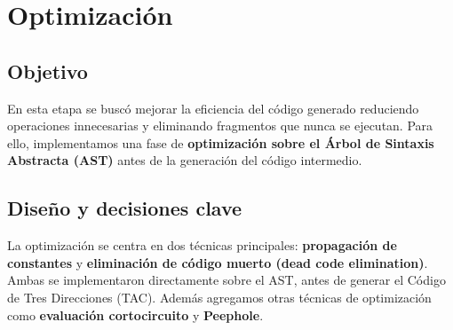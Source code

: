 \documentclass[12pt,a4paper]{article}
\begin{document}
\section{Optimización}

\subsection{Objetivo}
En esta etapa se buscó mejorar la eficiencia del código generado reduciendo operaciones innecesarias y eliminando fragmentos que nunca se ejecutan. Para ello, implementamos una fase de \textbf{optimización sobre el Árbol de Sintaxis Abstracta (AST)} antes de la generación del código intermedio.

\subsection{Diseño y decisiones clave}
La optimización se centra en dos técnicas principales: \textbf{propagación de constantes} y \textbf{eliminación de código muerto (dead code elimination)}. Ambas se implementaron directamente sobre el AST, antes de generar el Código de Tres Direcciones (TAC). Además agregamos otras técnicas de optimización como \textbf{evaluación cortocircuito} y \textbf{Peephole}.
\end{document}
